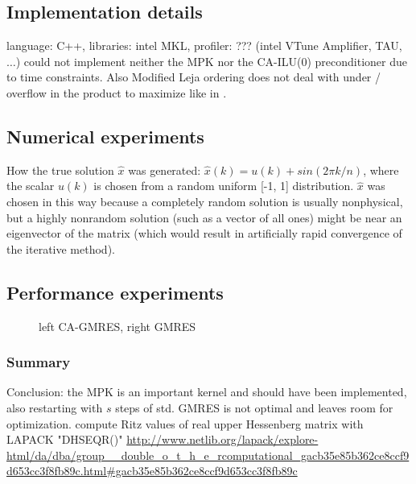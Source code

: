 \documentclass{scrartcl}
\begin{document}
\subsection{Implementation details}
language: C++, libraries: intel MKL, profiler: ??? (intel VTune Amplifier, TAU, $\ldots$) could not implement neither the MPK nor the CA-ILU(0) preconditioner due to time constraints. Also Modified Leja ordering does not deal with under / overflow in the product to maximize like in \cite{Hoemmen:2010:CKS:1970638}.
\subsection{Numerical experiments}

How the true solution $\hat{x}$ was generated: $\hat{x}(k) = u(k) + sin(2\pi k/n)$,
where the scalar $u(k)$ is chosen from a random uniform [-1, 1] distribution. 
$\hat{x}$ was chosen in this way because a completely random solution is usually nonphysical, but a highly nonrandom solution (such as a vector of all ones) might be near an eigenvector of the matrix (which would result in artificially rapid convergence of the iterative method).

\begin{center}
	\resizebox{1.0\textwidth}{!}{}
	\resizebox{1.0\textwidth}{!}{}
	\resizebox{1.0\textwidth}{!}{}
	\resizebox{1.0\textwidth}{!}{}
	\resizebox{1.0\textwidth}{!}{}
	\resizebox{1.0\textwidth}{!}{}		
\end{center}


\subsection{Performance experiments}
\begin{figure}[H]
\centering
	\resizebox{1.0\textwidth}{!}{}
\caption{left CA-GMRES, right GMRES}
\end{figure}
\subsubsection{Summary}
Conclusion: the MPK is an important kernel and should have been implemented, also restarting with $s$ steps of std. GMRES is not optimal and leaves room for optimization.
\iffalse
compute Ritz values of real upper Hessenberg matrix with LAPACK "DHSEQR()"
\url{http://www.netlib.org/lapack/explore-html/da/dba/group__double_o_t_h_e_rcomputational_gacb35e85b362ce8ccf9d653cc3f8fb89c.html#gacb35e85b362ce8ccf9d653cc3f8fb89c}
\\
\end{document}
